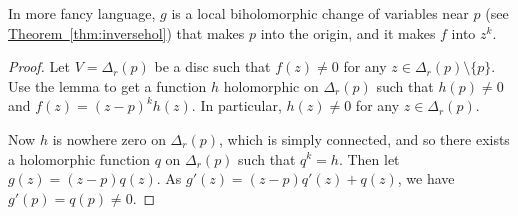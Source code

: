 \documentclass[12pt,openany]{book}
\theoremstyle{plain}
\theoremstyle{remark}
\theoremstyle{definition}
\theoremstyle{exercise}
\theoremstyle{example}
\newcommand{\thmref}[1]{\hyperref[#1]{Theorem~\ref*{#1}}}
\begin{document}
In more fancy language, $g$ is a local biholomorphic change of variables near
$p$ (see \thmref{thm:inversehol})
that makes $p$ into the origin, and it makes $f$ into $z^k$.

\begin{proof}
Let $V = \Delta_r(p)$ be a disc such that $f(z) \not= 0$ for any $z \in
\Delta_r(p) \setminus \{ p \}$.  Use the lemma to get a function $h$ holomorphic
on $\Delta_r(p)$ such that $h(p) \not= 0$ and $f(z) = {(z-p)}^k h(z)$.  In particular,
$h(z) \not= 0$ for any $z \in \Delta_r(p)$.

Now $h$ is nowhere zero on $\Delta_r(p)$, which is simply connected,
and so there exists a holomorphic function $q$ on $\Delta_r(p)$ such that
$q^k = h$.  Then let $g(z) = (z-p)q(z)$.  As
$g'(z) = (z-p) q'(z) + q(z)$, we have $g'(p) = q(p) \not= 0$.
\end{proof}
\end{document}
